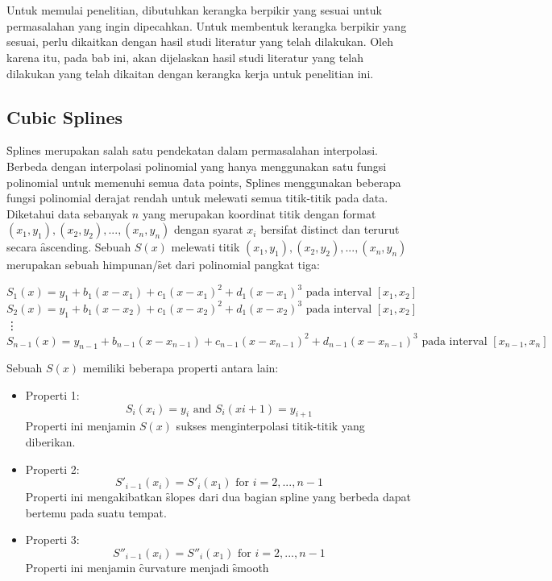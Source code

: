 \chapter{\babDua}
\label{bab:2}
Untuk memulai penelitian, dibutuhkan kerangka berpikir yang sesuai untuk permasalahan yang ingin dipecahkan. Untuk membentuk kerangka berpikir yang sesuai, perlu dikaitkan dengan hasil studi literatur yang telah dilakukan. Oleh karena itu, pada bab ini, akan dijelaskan hasil studi literatur yang telah dilakukan yang telah dikaitan dengan kerangka kerja untuk penelitian ini.


\section{Cubic Splines}
\label{sec:cubicSplines}
\f{Splines} merupakan salah satu pendekatan dalam permasalahan interpolasi. Berbeda dengan interpolasi polinomial yang hanya menggunakan satu fungsi polinomial untuk memenuhi semua \f{data points}, \f{Splines} menggunakan beberapa fungsi polinomial derajat rendah untuk melewati semua titik-titik pada data.
Diketahui data sebanyak $n$ yang merupakan koordinat titik dengan format $(x_1, y_1), (x_2, y_2), ..., (x_n, y_n)$ dengan syarat $x_i$ bersifat \f{distinct} dan terurut secara \f{ascending}. Sebuah  $S(x)$ melewati titik $(x_1, y_1), (x_2, y_2), ..., (x_n, y_n)$ merupakan sebuah himpunan/\f{set} dari polinomial pangkat tiga:
\begin{center}
	\[ S_{1}(x) = y_1 + b_1(x - x_1) + c_1(x - x_1)^2 + d_1(x - x_1)^3 \text{  pada interval  } [x_1, x_2] \]
	\[ S_{2}(x) = y_1 + b_1(x - x_2) + c_1(x - x_2)^2 + d_1(x - x_2)^3 \text{  pada interval  } [x_1, x_2] \]
	\vdots
	\[ S_{n-1}(x) = y_{n-1} + b_{n-1}(x - x_{n-1}) + c_{n-1}(x - x_{n-1})^2 + d_{n-1}(x - x_{n-1})^3 \text{  pada interval  } [x_{n-1}, x_n]\]
\end{center}

Sebuah  $S(x)$ memiliki beberapa properti antara lain:
\begin{itemize}
	\item Properti 1: \[ S_{i}(x_i) = y_i  \text{  and  }  S_{i}(x{i}+1) = y_{i+1} \] Properti ini menjamin \(S(x)\) sukses menginterpolasi titik-titik yang diberikan.
	\item Properti 2: \[ S'_{i-1}(x_i) = S'_{i}(x_1) \text{  for  } i=2,...,n-1 \] Properti ini mengakibatkan \f{slopes} dari dua bagian spline yang berbeda dapat bertemu pada suatu tempat.
	\item Properti 3: \[ S''_{i-1}(x_i) = S''_{i}(x_1) \text{  for  } i=2,...,n-1 \] Properti ini menjamin \f{curvature} menjadi \f{smooth}
\end{itemize}

